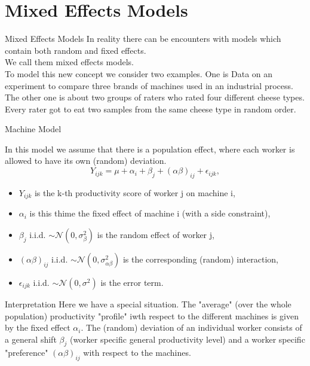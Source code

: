 \documentclass[unknownkeysallowed]{beamer}
\begin{document}
\section{Mixed Effects Models}
\begin{frame}{Mixed Effects Models}
	In reality there can be encounters with models which contain both random and fixed effects. \\ We call them mixed effects models.\\
	To model this new concept we consider two examples. One is Data on an experiment to compare three brands of machines used in an industrial process. The other one is about two groups of raters who rated four different cheese types. Every rater got to eat two samples from the same cheese type in random order.
\end{frame}

\begin{frame}{Machine Model}
	
	In this model we assume that there is a population effect, where each worker is allowed to have its own (random) deviation.
	\begin{equation*}
		Y_{ijk} = \mu + \alpha_i + \beta_j + (\alpha \beta)_{ij} + \epsilon_{ijk},
	\end{equation*}
	
	\begin{itemize}
		\item $Y_{ijk}$ is the k-th productivity score of worker j on machine i,
		\item $\alpha_i$ is this thime the fixed effect of machine i (with a side constraint),
		\item $\beta_j$ i.i.d. $\sim \mathcal{N}(0,\sigma^2_{\beta})$ is the random effect of worker j,
		\item $(\alpha \beta)_{ij}$ i.i.d. $\sim \mathcal{N}(0,\sigma^2_{\alpha \beta})$ is the corresponding (random) interaction,
		\item $\epsilon_{ijk}$ i.i.d. $\sim \mathcal{N}(0,\sigma^2)$ is the error term.
	\end{itemize}
	

\end{frame}

\begin{frame}{Interpretation}
	Here we have a special situation. The "average" (over the whole population) productivity "profile" iwth respect to the different machines is given by the fixed effect $\alpha_i$. The (random) deviation of an individual worker consists of a general shift $\beta_j$ (worker specific general productivity level) and a worker specific "preference" $(\alpha \beta)_{ij}$ with respect to the machines.
\end{frame}
\end{document}
